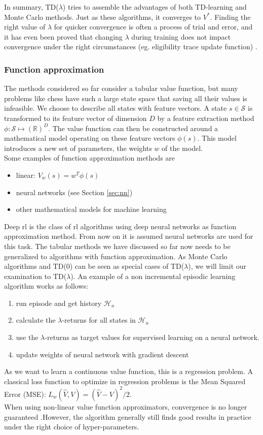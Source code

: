 In summary, TD($\lambda$) tries to assemble the advantages of both TD-learning and Monte Carlo methods. Just as these algorithms, it converges to $V^*$. Finding the right value of $\lambda$ for quicker convergence is often a process of trial and error, and it has even been proved that changing $\lambda$ during training does not impact convergence under the right circumstances (eg. eligibility trace update function) \cite{bert96}.

\subsubsection*{Function approximation}
The methods considered so far consider a tabular value function, but many problems like chess have such a large state space that saving all their values is infeasible. We choose to describe all states with feature vectors. A state $s \in \mathcal{S}$ is transformed to its feature vector of dimension $D$ by a feature extraction method $\phi: \mathcal{S} \mapsto \mathbb{(R)}^D$. The value function can then be constructed around a mathematical model operating on these feature vectors $\phi(s)$. This model introduces a new set of parameters, the weights $w$ of the model. \\
Some examples of function approximation methods are
\begin{itemize}
\item linear: $V_w(s)=w^T \phi(s)$
\item neural networks (see Section \ref{sec:nn})
\item other mathematical models for machine learning 
\end{itemize}

Deep \gls{rl} is the class of \gls{rl} algorithms using deep neural networks as function approximation method. From now on it is assumed neural networks are used for this task. The tabular methods we have discussed so far now needs to be generalized to algorithms with function approximation. As Monte Carlo algorithms and TD(0) can be seen as special cases of TD($\lambda$), we will limit our examination to TD($\lambda$). An example of a non incremental episodic learning algorithm works as follows:
\begin{enumerate}
\item run episode and get history $\mathcal{H}_n$
\item calculate the $\lambda$-returns for all states in $\mathcal{H}_n$
\item use the $\lambda$-returns as target values for supervised learning on a neural network.
\item update weights of neural network with gradient descent 
\end{enumerate} 
As we want to learn a continuous value function, this is a regression problem. A classical loss function to optimize in regression problems is the Mean Squared Error (MSE): $L_w(\hat{V},V)=(\hat{V}-V)^2/2$. \\
When using non-linear value function approximators, convergence is no longer guaranteed \cite{baird95}.However, the algorithm generally still finds good results in practice  under the right choice of hyper-parameters.

